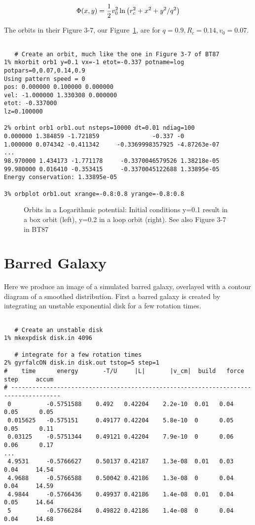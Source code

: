 \begin{itemize}
\begin{itemize}
$$
   \Phi(x,y) = {1\over 2} v_0^2
                    \ln{ \left( r_c^2 + x^2  + y^2/q^2 \right) }
$$

The orbits in their Figure 3-7, our Figure~\ref{f:log}, are for
$q=0.9, R_c=0.14, v_0=0.07$.

\footnotesize\begin{verbatim}

   # Create an orbit, much like the one in Figure 3-7 of BT87
1% mkorbit orb1 y=0.1 vx=-1 etot=-0.337 potname=log potpars=0,0.07,0.14,0.9
Using pattern speed = 0
pos: 0.000000 0.100000 0.000000
vel: -1.000000 1.330308 0.000000
etot: -0.337000
lz=0.100000

2% orbint orb1 orb1.out nsteps=10000 dt=0.01 ndiag=100
0.000000 1.384859 -1.721859               -0.337 -0
1.000000 0.074342 -0.411342     -0.3369998357925 -4.87263e-07
...
98.970000 1.434173 -1.771178     -0.3370046579526 1.38218e-05
99.980000 0.016410 -0.353415     -0.3370045122688 1.33895e-05
Energy conservation: 1.33895e-05

3% orbplot orb1.out xrange=-0.8:0.8 yrange=-0.8:0.8

\end{verbatim}\normalsize

\begin{figure}[t]
\caption[Orbits in a Logarithmic potential]
{Orbits in a Logarithmic potential:
Initial conditions y=0.1 result in a box orbit (left), 
y=0.2 in a loop orbit (right). See also Figure 3-7 in BT87}
\label{f:log}
\end{figure}

\section{Barred Galaxy}

Here we produce an image of a simulated barred galaxy, overlayed with a contour diagram
of a smoothed distribution. First a barred galaxy is created by
integrating an unstable exponential disk for a few rotation times.

\footnotesize\begin{verbatim}

   # Create an unstable disk
1% mkexpdisk disk.in 4096 

   # integrate for a few rotation times
2% gyrfalcON disk.in disk.out tstop=5 step=1
#    time      energy       -T/U     |L|       |v_cm|  build   force    step     accum
# ------------------------------------------------------------------------------------
 0          -0.5751588    0.492   0.42204    2.2e-10  0.01   0.04       0.05      0.05
 0.015625   -0.575151     0.49177 0.42204    5.8e-10  0      0.05       0.05      0.11
 0.03125    -0.5751344    0.49121 0.42204    7.9e-10  0      0.06       0.06      0.17
...
 4.9531     -0.5766627    0.50137 0.42187    1.3e-08  0.01   0.03       0.04     14.54
 4.9688     -0.5766588    0.50042 0.42186    1.3e-08  0      0.04       0.04     14.59
 4.9844     -0.5766436    0.49937 0.42186    1.4e-08  0.01   0.04       0.05     14.64
 5          -0.5766284    0.49822 0.42186    1.4e-08  0      0.04       0.04     14.68


\end{verbatim}
\end{itemize}
\end{itemize}
